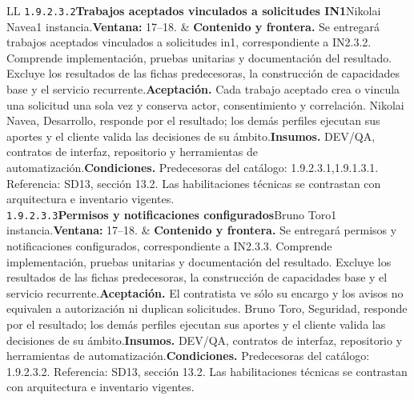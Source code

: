 \begin{longtable}{L{\tabcolsep\relax}L{\tabcolsep\relax}}
\texttt{1.\allowbreak{}9.\allowbreak{}2.\allowbreak{}3.\allowbreak{}2}\newline{}\textbf{Trabajos aceptados vinculados a solicitudes IN1}\newline{}Nikolai Navea\newline{}1 instancia.\newline{}\textbf{Ventana:} 17--18. & \textbf{Contenido y frontera.} Se entregará trabajos aceptados vinculados a solicitudes in1, correspondiente a IN2.3.2. Comprende implementación, pruebas unitarias y documentación del resultado. Excluye los resultados de las fichas predecesoras, la construcción de capacidades base y el servicio recurrente.\newline{}\textbf{Aceptación.} Cada trabajo aceptado crea o vincula una solicitud una sola vez y conserva actor, consentimiento y correlación. Nikolai Navea, Desarrollo, responde por el resultado; los demás perfiles ejecutan sus aportes y el cliente valida las decisiones de su ámbito.\newline{}\textbf{Insumos.} DEV/QA, contratos de interfaz, repositorio y herramientas de automatización.\newline{}\textbf{Condiciones.} Predecesoras del catálogo: 1.9.2.3.1,1.9.1.3.1. Referencia: SD13, sección 13.2. Las habilitaciones técnicas se contrastan con arquitectura e inventario vigentes.\\\hline
\texttt{1.\allowbreak{}9.\allowbreak{}2.\allowbreak{}3.\allowbreak{}3}\newline{}\textbf{Permisos y notificaciones configurados}\newline{}Bruno Toro\newline{}1 instancia.\newline{}\textbf{Ventana:} 17--18. & \textbf{Contenido y frontera.} Se entregará permisos y notificaciones configurados, correspondiente a IN2.3.3. Comprende implementación, pruebas unitarias y documentación del resultado. Excluye los resultados de las fichas predecesoras, la construcción de capacidades base y el servicio recurrente.\newline{}\textbf{Aceptación.} El contratista ve sólo su encargo y los avisos no equivalen a autorización ni duplican solicitudes. Bruno Toro, Seguridad, responde por el resultado; los demás perfiles ejecutan sus aportes y el cliente valida las decisiones de su ámbito.\newline{}\textbf{Insumos.} DEV/QA, contratos de interfaz, repositorio y herramientas de automatización.\newline{}\textbf{Condiciones.} Predecesoras del catálogo: 1.9.2.3.2. Referencia: SD13, sección 13.2. Las habilitaciones técnicas se contrastan con arquitectura e inventario vigentes.\\\hline

\end{longtable}
